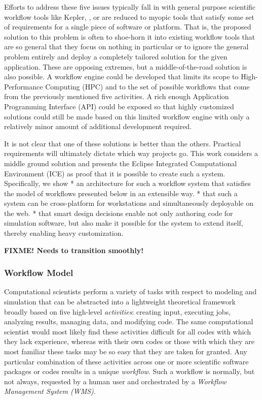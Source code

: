 Efforts to address these five issues typically fall in with general
purpose scientific workflow tools like Kepler, \cite{kepler}, or are
reduced to myopic tools that satisfy some set of requirements for a
single piece of software or platform. That is, the proposed solution to
this problem is often to shoe-horn it into existing workflow tools that
are so general that they focus on nothing in particular or to ignore the
general problem entirely and deploy a completely tailored solution for
the given application. These are opposing extremes, but a
middle-of-the-road solution is also possible. A workflow engine could be
developed that limits its scope to High-Performance Computing (HPC) and
to the set of possible workflows that come from the previously mentioned
five activities. A rich enough Application Programming Interface (API)
could be exposed so that highly customized solutions could still be made
based on this limited workflow engine with only a relatively minor
amount of additional development required.

It is not clear that one of these solutions is better than the others.
Practical requirements will ultimately dictate which way projects go.
This work considers a middle ground solution and presents the Eclipse
Integrated Computational Environment (ICE) as proof that it is possible
to create such a system. Specifically, we show * an architecture for
such a workflow system that satisfies the model of workflows presented
below in an extensible way. * that such a system can be cross-platform
for workstations and simultaneously deployable on the web. * that smart
design decisions enable not only authoring code for simulation software,
but also make it possible for the system to extend itself, thereby
enabling heavy customization.

\textbf{FIXME! Needs to transition smoothly!}

\subsubsection{Workflow Model}\label{workflow-model}

Computational scientists perform a variety of tasks with respect to
modeling and simulation that can be abstracted into a lightweight
theoretical framework broadly based on five high-level
\emph{activities}: creating input, executing jobs, analyzing results,
managing data, and modifying code. The same computational scientist
would most likely find these activities difficult for all codes with
which they lack experience, whereas with their own codes or those with
which they are most familiar these tasks may be so easy that they are
taken for granted. Any particular combination of these activities across
one or more scientific software packages or codes results in a unique
\emph{workflow}. Such a workflow is normally, but not always, requested
by a human user and orchestrated by a \emph{Workflow Management System
(WMS)}.

